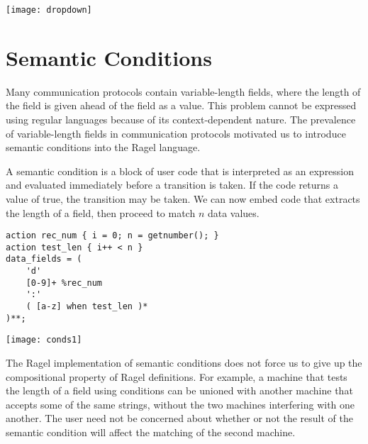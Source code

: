 \documentclass[letterpaper,11pt,oneside]{book}
\newcommand{\verbspace}{\vspace{10pt}}
\newcommand{\graphspace}{\vspace{10pt}}
\newenvironment{inline_code}{\def\baselinestretch{1}\vspace{12pt}\small}{}
\begin{document}
\graphspace
\begin{center}
\texttt{[image: dropdown]}
\end{center}
\graphspace


\section{Semantic Conditions}
\label{semantic}

Many communication protocols contain variable-length fields, where the length
of the field is given ahead of the field as a value. This
problem cannot be expressed using regular languages because of its
context-dependent nature. The prevalence of variable-length fields in
communication protocols motivated us to introduce semantic conditions into
the Ragel language.

A semantic condition is a block of user code that is interpreted as an
expression and evaluated immediately
before a transition is taken. If the code returns a value of true, the
transition may be taken.  We can now embed code that extracts the length of a
field, then proceed to match $n$ data values.

\begin{inline_code}
\begin{verbatim}
action rec_num { i = 0; n = getnumber(); }
action test_len { i++ < n }
data_fields = (
    'd' 
    [0-9]+ %rec_num 
    ':'
    ( [a-z] when test_len )*
)**;
\end{verbatim}
\end{inline_code}
\verbspace
% main := data_fields;

\graphspace
\begin{center}
\texttt{[image: conds1]}
\end{center}
\graphspace

The Ragel implementation of semantic conditions does not force us to give up the
compositional property of Ragel definitions. For example, a machine that tests
the length of a field using conditions can be unioned with another machine
that accepts some of the same strings, without the two machines interfering with
one another. The user need not be concerned about whether or not the result of the
semantic condition will affect the matching of the second machine.
\end{document}
